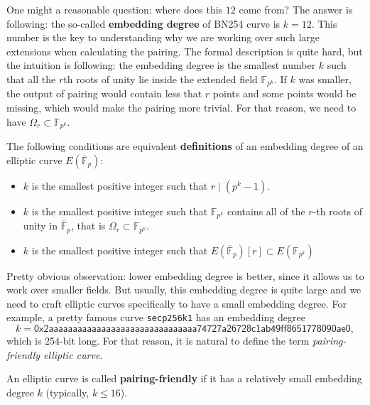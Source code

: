 \documentclass[../lecture-notes.tex]{subfiles}
\begin{document}
\begin{remark}
    One might a reasonable question: where does this $12$ come from? The answer is following: the so-called \textbf{embedding degree} of BN254 curve is $k=12$. This number is the key to understanding why we are working over such large extensions when calculating the pairing. The formal description is quite hard, but the intuition is following: the embedding degree is the smallest number $k$ such that all the $r$th roots of unity lie inside the extended field $\mathbb{F}_{p^k}$. If $k$ was smaller, the output of pairing would contain less that $r$ points and some points would be missing, which would make the pairing more trivial. For that reason, we need to have $\Omega_r \subset \mathbb{F}_{p^k}$.
\end{remark}

\begin{definition}
    The following conditions are equivalent \textbf{definitions} of an embedding degree of an elliptic curve $E(\overline{\mathbb{F}}_p)$:
    \begin{itemize}
        \item $k$ is the smallest positive integer such that $r \mid (p^k-1)$.
        \item $k$ is the smallest positive integer such that $\mathbb{F}_{p^k}$ contains all of the $r$-th roots of unity in $\overline{\mathbb{F}}_p$, that is $\Omega_r \subset \mathbb{F}_{p^k}$.
        \item $k$ is the smallest positive integer such that $E(\overline{\mathbb{F}}_p)[r] \subset E(\mathbb{F}_{p^k})$
    \end{itemize}
\end{definition}

Pretty obvious observation: lower embedding degree is better, since it allows us to work over smaller fields. But usually, this embedding degree is quite large and we need to craft elliptic curves specifically to have a small embedding degree. For example, a pretty famous curve \texttt{secp256k1} has an embedding degree
\begin{equation*}
    k = \mathsf{0x2aaaaaaaaaaaaaaaaaaaaaaaaaaaaaaa74727a26728c1ab49ff8651778090ae0},
\end{equation*}
which is 254-bit long. For that reason, it is natural to define the term \textit{pairing-friendly elliptic curve}.
\begin{definition}
    An elliptic curve is called \textbf{pairing-friendly} if it has a relatively small embedding degree $k$ (typically, $k \leq 16$).
\end{definition}
\end{document}
